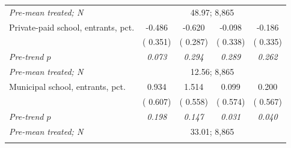 \begin{tabular}{lcccc}
\quad \textit{Pre-mean treated; N} & \multicolumn{4}{c}{\scriptsize   48.97;  8,865} \\
\addlinespace
Private-paid school, entrants, pct. &  -0.486 &  -0.620\sym{**} &  -0.098 &  -0.186 \\
 & ( 0.351) & ( 0.287) & ( 0.338) & ( 0.335) \\
\quad \textit{Pre-trend \(p\)} & \textit{0.073} & \textit{0.294} & \textit{0.289} & \textit{0.262} \\
\quad \textit{Pre-mean treated; N} & \multicolumn{4}{c}{\scriptsize   12.56;  8,865} \\
\addlinespace
Municipal school, entrants, pct. &   0.934 &   1.514\sym{***} &   0.099 &   0.200 \\
 & ( 0.607) & ( 0.558) & ( 0.574) & ( 0.567) \\
\quad \textit{Pre-trend \(p\)} & \textit{0.198} & \textit{0.147} & \textit{0.031} & \textit{0.040} \\
\quad \textit{Pre-mean treated; N} & \multicolumn{4}{c}{\scriptsize   33.01;  8,865} \\
\addlinespace
\bottomrule
\end{tabular}

